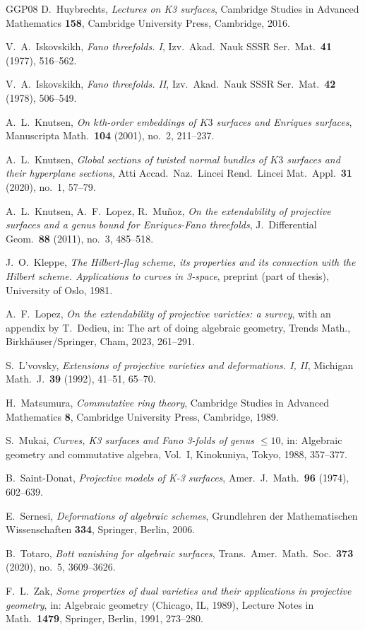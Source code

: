 \documentclass[11pt,twoside]{amsart}
\theoremstyle{plain}
\theoremstyle{definition}
\begin{document}
\begin{thebibliography}{GGP08}
 D.~Huybrechts, \emph{Lectures on K3 surfaces}, Cambridge Studies in Advanced Mathematics \textbf{158}, Cambridge University Press, Cambridge, 2016.

 V.~A.~Iskovskikh, \emph{Fano threefolds. I}, Izv.\ Akad.\ Nauk SSSR Ser.\ Mat.\ \textbf{41} (1977), 516--562.

 V.~A.~Iskovskikh, \emph{Fano threefolds. II}, Izv.\ Akad.\ Nauk SSSR Ser.\ Mat.\ \textbf{42} (1978), 506--549.

 A.~L.~Knutsen, \emph{On $k$th-order embeddings of $K3$ surfaces and Enriques surfaces}, Manuscripta Math.\ \textbf{104} (2001), no.~2, 211--237.

 A.~L.~Knutsen, \emph{Global sections of twisted normal bundles of $K3$ surfaces and their hyperplane sections}, Atti Accad.\ Naz.\ Lincei Rend.\ Lincei Mat.\ Appl.\ \textbf{31} (2020), no.~1, 57--79.

 A.~L.~Knutsen, A.~F.~Lopez, R.~Mu\~noz, \emph{On the extendability of projective surfaces and a genus bound for Enriques-Fano threefolds}, J.\ Differential Geom.\ \textbf{88} (2011), no.~3, 485--518.


 J.~O.~Kleppe, \emph{The Hilbert-flag scheme, its properties and its connection with the Hilbert scheme. Applications to curves in 3-space}, preprint (part of thesis), University of Oslo, 1981.

 A.~F.~Lopez, \emph{On the extendability of projective varieties: a survey}, with an appendix by T.~Dedieu, in: The art of doing algebraic geometry, Trends Math., Birkh\"auser/Springer, Cham, 2023, 261--291.

 S.~L'vovsky, \emph{Extensions of projective varieties and deformations. I, II}, Michigan Math.\ J.\ \textbf{39} (1992), 41--51, 65--70.

 H.~Matsumura, \emph{Commutative ring theory}, Cambridge Studies in Advanced Mathematics \textbf{8}, Cambridge University Press, Cambridge, 1989.

 S.~Mukai, \emph{Curves, K3 surfaces and Fano 3-folds of genus $\le 10$}, in: Algebraic geometry and commutative algebra, Vol.~I, Kinokuniya, Tokyo, 1988, 357--377.

 B.~Saint-Donat, \emph{Projective models of K-3 surfaces}, Amer.\ J.\ Math.\ \textbf{96} (1974), 602--639.

 E.~Sernesi, \emph{Deformations of algebraic schemes}, Grundlehren der Mathematischen Wissenschaften \textbf{334}, Springer, Berlin, 2006.

 B.~Totaro, \emph{Bott vanishing for algebraic surfaces}, Trans.\ Amer.\ Math.\ Soc.\ \textbf{373} (2020), no.~5, 3609--3626.


 F.~L.~Zak, \emph{Some properties of dual varieties and their applications in projective geometry}, in: Algebraic geometry (Chicago, IL, 1989), Lecture Notes in Math.\ \textbf{1479}, Springer, Berlin, 1991, 273--280.


\end{thebibliography}
\end{document}
